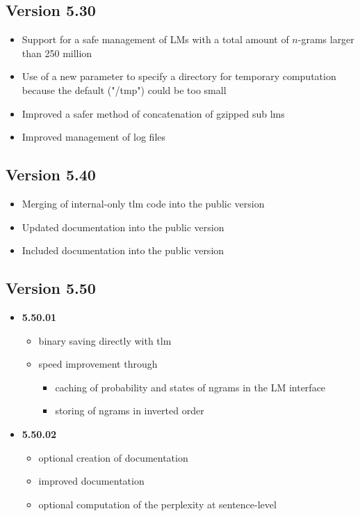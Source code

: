 \documentclass[11pt]{article}
\begin{document}
\subsection{Version 5.30}
\begin{itemize}
\item Support for a safe management of LMs with a total amount of $n$-grams larger than 250 million
\item Use of a new parameter to specify a directory for temporary computation because the default ("/tmp") could be too small
\item Improved a safer method of concatenation of gzipped sub lms
\item Improved management of log files
\end{itemize}

\subsection{Version 5.40}
\begin{itemize}
\item Merging of internal-only tlm code into the public version
\item Updated documentation into the public version
\item Included documentation into the public version
\end{itemize}

\subsection{Version 5.50}

\begin{itemize}
\item {\bf 5.50.01}
\begin{itemize}
\item binary saving directly with tlm
\item speed improvement through 
\begin{itemize}
\item caching of probability and states of ngrams in the LM interface
\item storing of ngrams in inverted order
\end{itemize}
\end{itemize}

\item {\bf 5.50.02}
\begin{itemize}
\item optional creation of documentation
\item improved documentation
\item optional computation of the perplexity at sentence-level
\end{itemize}

\end{itemize}
\end{document}
